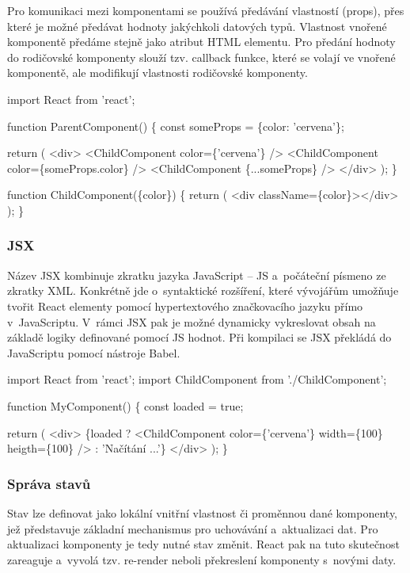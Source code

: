 Pro komunikaci mezi komponentami se používá předávání vlastností (props), přes které je možné předávat hodnoty jakýchkoli datových typů. 
Vlastnost vnořené komponentě předáme stejně jako atribut HTML elementu. 
Pro předání hodnoty do rodičovské komponenty slouží tzv. callback funkce, které se volají ve vnořené komponentě, ale modifikují vlastnosti rodičovské komponenty.\cite{reactbanks,react}

\begin{prog}
import React from 'react';

function ParentComponent() \{
  const someProps = \{color: 'cervena'\};

  return (
    <div>
      <ChildComponent color=\{'cervena'\} />
      <ChildComponent color=\{someProps.color\} />
      <ChildComponent \{...someProps\} />
    </div>
  );
\}

function ChildComponent(\{color\}) \{
  return (
    <div className=\{color\}></div>
  );
\}
\end{prog}

\subsubsection{JSX}

Název JSX kombinuje zkratku jazyka JavaScript -- JS a~počáteční písmeno ze zkratky XML. 
Konkrétně jde o~syntaktické rozšíření, které vývojářům umožňuje tvořit React elementy pomocí hypertextového značkovacího jazyku přímo v~JavaScriptu. 
V~rámci JSX pak je možné dynamicky vykreslovat obsah na základě logiky definované pomocí JS hodnot.
Při kompilaci se JSX překládá do JavaScriptu pomocí nástroje Babel.\cite{reactbanks,react}

\begin{prog}
import React from 'react';
import ChildComponent from './ChildComponent';

function MyComponent() \{
  const loaded = true;

  return (
    <div>
      \{loaded ? 
        <ChildComponent color=\{'cervena'\} width=\{100\} heigth=\{100\} /> 
        : 'Načítání ...'\}
    </div>
  );
\}
\end{prog}

\subsubsection{Správa stavů}

Stav lze definovat jako lokální vnitřní vlastnost či proměnnou dané komponenty, jež představuje základní mechanismus pro uchovávání a~aktualizaci dat. 
Pro aktualizaci komponenty je tedy nutné stav změnit. React pak na tuto skutečnost zareaguje a~vyvolá tzv. re-render neboli překreslení komponenty s~novými daty.

